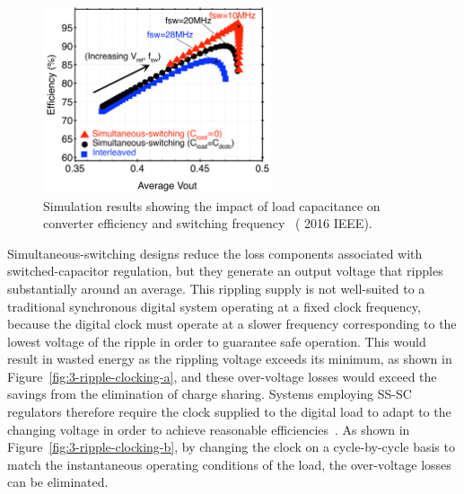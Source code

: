 \documentclass[graybox]{svmult}
\begin{document}
\begin{figure}
  \centering
  \includegraphics[width=0.6\textwidth]{3-dcdc-analysis-cap}
  \caption{Simulation results showing the impact of load capacitance on converter efficiency and switching frequency~\cite{Zimmer2016} ({\textcopyright} 2016 IEEE).}
  \label{fig:3-dcdc-analysis-cap}
\end{figure}

Simultaneous-switching designs reduce the loss components associated with switched-capacitor regulation, but they generate an output voltage that ripples substantially around an average.
This rippling supply is not well-suited to a traditional synchronous digital system operating at a fixed clock frequency, because the digital clock must operate at a slower frequency corresponding to the lowest voltage of the ripple in order to guarantee safe operation.
This would result in wasted energy as the rippling voltage exceeds its minimum, as shown in Figure~\ref{fig:3-ripple-clocking-a}, and these over-voltage losses would exceed the savings from the elimination of charge sharing.
Systems employing SS-SC regulators therefore require the clock supplied to the digital load to adapt to the changing voltage in order to achieve reasonable efficiencies~\cite{Jevtic2014}.
As shown in Figure~\ref{fig:3-ripple-clocking-b}, by changing the clock on a cycle-by-cycle basis to match the instantaneous operating conditions of the load, the over-voltage losses can be eliminated.
\end{document}
